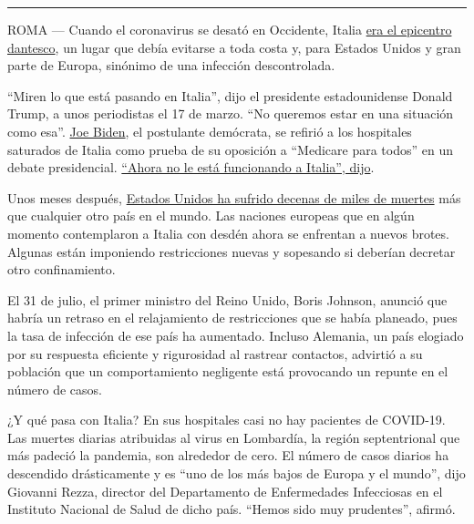 \begin{center}\rule{0.5\linewidth}{\linethickness}\end{center}

ROMA --- Cuando el coronavirus se desató en Occidente, Italia
\href{https://www.nytimes3xbfgragh.onion/interactive/2020/03/27/world/europe/coronavirus-italy-bergamo.html}{era
el epicentro dantesco}, un lugar que debía evitarse a toda costa y, para
Estados Unidos y gran parte de Europa, sinónimo de una infección
descontrolada.

``Miren lo que está pasando en Italia'', dijo el presidente
estadounidense Donald Trump, a unos periodistas el 17 de marzo. ``No
queremos estar en una situación como esa''.
\href{https://www.nytimes3xbfgragh.onion/es/interactive/2020/espanol/estados-unidos/joe-biden-elecciones.html}{Joe
Biden}, el postulante demócrata, se refirió a los hospitales saturados
de Italia como prueba de su oposición a ``Medicare para todos'' en un
debate presidencial.
\href{https://edition.cnn.com/politics/live-news/2020-democratic-debate-live-updates/h_501d1e381370480bd021916a86029534}{``Ahora
no le está funcionando a Italia'', dijo}.

Unos meses después,
\href{https://www.nytimes3xbfgragh.onion/es/interactive/2020/espanol/mundo/coronavirus-en-estados-unidos.html}{Estados
Unidos ha sufrido decenas de miles de muertes} más que cualquier otro
país en el mundo. Las naciones europeas que en algún momento
contemplaron a Italia con desdén ahora se enfrentan a nuevos brotes.
Algunas están imponiendo restricciones nuevas y sopesando si deberían
decretar otro confinamiento.

El 31 de julio, el primer ministro del Reino Unido, Boris Johnson,
anunció que habría un retraso en el relajamiento de restricciones que se
había planeado, pues la tasa de infección de ese país ha aumentado.
Incluso Alemania, un país elogiado por su respuesta eficiente y
rigurosidad al rastrear contactos, advirtió a su población que un
comportamiento negligente está provocando un repunte en el número de
casos.

¿Y qué pasa con Italia? En sus hospitales casi no hay pacientes de
COVID-19. Las muertes diarias atribuidas al virus en Lombardía, la
región septentrional que más padeció la pandemia, son alrededor de cero.
El número de casos diarios ha descendido drásticamente y es ``uno de los
más bajos de Europa y el mundo'', dijo Giovanni Rezza, director del
Departamento de Enfermedades Infecciosas en el Instituto Nacional de
Salud de dicho país. ``Hemos sido muy prudentes'', afirmó.

